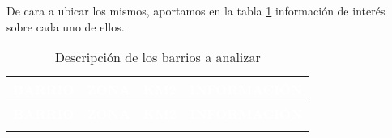 \documentclass[12pt,a4paper,twoside]{book}
\begin{document}
De cara a ubicar los mismos, aportamos en la tabla \ref{tab:tab_barrios} información de interés sobre cada uno de ellos.

\begin{longtable}{>{\raggedright\arraybackslash}p{7em}lc>{\raggedright\arraybackslash}m{22em}}
\caption{Descripción de los barrios a analizar}\label{tab:tab_barrios} \\
\hline
\rowcolor[HTML]{004AAD} 
\textcolor{white}{\textbf{BARRIO}} & 
\textcolor{white}{\textbf{ZONA}} & 
\textcolor{white}{\textbf{KM2}} & 
\textcolor{white}{\textbf{INFORMACIÓN}} \\
\hline
\endfirsthead

\hline
\rowcolor[HTML]{004AAD} 
\textcolor{white}{\textbf{BARRIO}} & 
\textcolor{white}{\textbf{ZONA}} & 
\textcolor{white}{\textbf{KM2}} & 
\textcolor{white}{\textbf{INFORMACIÓN}} \\
\hline
\endhead

\hline
\endfoot


\end{longtable}
\end{document}
